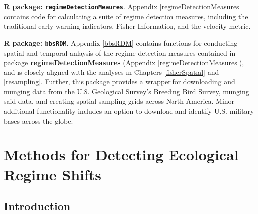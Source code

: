 \documentclass[print]{nuthesis}
\begin{document}
\textbf{R package: \texttt{regimeDetectionMeaures}}. Appendix \ref{regimeDetectionMeasures} contains code for calculating a suite of regime detection measures, including the traditional early-warning indicators, Fisher Information, and the velocity metric.

\textbf{R package: \texttt{bbsRDM}}. Appendix \ref{bbsRDM} contains functions for conducting spatial and temporal anlaysis of the regime detection measures contained in package \textbf{regimeDetectionMeasures} (Appendix \ref{regimeDetectionMeasures}), and is closely aligned with the analyses in Chapters \ref{fisherSpatial} and \ref{resampling}. Further, this package provides a wrapper for downloading and munging data from the U.S. Geological Survey's Breeding Bird Survey, munging said data, and creating spatial sampling grids across North America. Minor additional functionality includes an option to download and identify U.S. military bases across the globe.

\hypertarget{rdmReview}{%
\chapter{Methods for Detecting Ecological Regime Shifts}\label{rdmReview}}

\hypertarget{introduction}{%
\section{Introduction}\label{introduction}}
\end{document}
